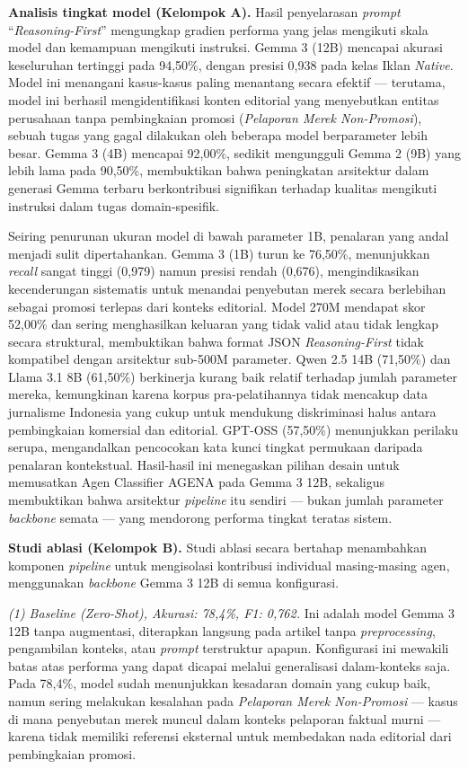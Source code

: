 \documentclass{ieeeaccess}
\begin{document}
\textbf{Analisis tingkat model (Kelompok A).} Hasil penyelarasan \textit{prompt} ``\textit{Reasoning-First}'' mengungkap gradien performa yang jelas mengikuti skala model dan kemampuan mengikuti instruksi. Gemma 3 (12B) mencapai akurasi keseluruhan tertinggi pada 94,50\%, dengan presisi 0,938 pada kelas Iklan \textit{Native}. Model ini menangani kasus-kasus paling menantang secara efektif --- terutama, model ini berhasil mengidentifikasi konten editorial yang menyebutkan entitas perusahaan tanpa pembingkaian promosi (\textit{Pelaporan Merek Non-Promosi}), sebuah tugas yang gagal dilakukan oleh beberapa model berparameter lebih besar. Gemma 3 (4B) mencapai 92,00\%, sedikit mengungguli Gemma 2 (9B) yang lebih lama pada 90,50\%, membuktikan bahwa peningkatan arsitektur dalam generasi Gemma terbaru berkontribusi signifikan terhadap kualitas mengikuti instruksi dalam tugas domain-spesifik.

Seiring penurunan ukuran model di bawah parameter 1B, penalaran yang andal menjadi sulit dipertahankan. Gemma 3 (1B) turun ke 76,50\%, menunjukkan \textit{recall} sangat tinggi (0,979) namun presisi rendah (0,676), mengindikasikan kecenderungan sistematis untuk menandai penyebutan merek secara berlebihan sebagai promosi terlepas dari konteks editorial. Model 270M mendapat skor 52,00\% dan sering menghasilkan keluaran yang tidak valid atau tidak lengkap secara struktural, membuktikan bahwa format JSON \textit{Reasoning-First} tidak kompatibel dengan arsitektur sub-500M parameter. Qwen 2.5 14B (71,50\%) dan Llama 3.1 8B (61,50\%) berkinerja kurang baik relatif terhadap jumlah parameter mereka, kemungkinan karena korpus pra-pelatihannya tidak mencakup data jurnalisme Indonesia yang cukup untuk mendukung diskriminasi halus antara pembingkaian komersial dan editorial. GPT-OSS (57,50\%) menunjukkan perilaku serupa, mengandalkan pencocokan kata kunci tingkat permukaan daripada penalaran kontekstual. Hasil-hasil ini menegaskan pilihan desain untuk memusatkan Agen Classifier AGENA pada Gemma 3 12B, sekaligus membuktikan bahwa arsitektur \textit{pipeline} itu sendiri --- bukan jumlah parameter \textit{backbone} semata --- yang mendorong performa tingkat teratas sistem.

\textbf{Studi ablasi (Kelompok B).} Studi ablasi secara bertahap menambahkan komponen \textit{pipeline} untuk mengisolasi kontribusi individual masing-masing agen, menggunakan \textit{backbone} Gemma 3 12B di semua konfigurasi.

\textit{(1) Baseline (Zero-Shot), Akurasi: 78,4\%, F1: 0,762.} Ini adalah model Gemma 3 12B tanpa augmentasi, diterapkan langsung pada artikel tanpa \textit{preprocessing}, pengambilan konteks, atau \textit{prompt} terstruktur apapun. Konfigurasi ini mewakili batas atas performa yang dapat dicapai melalui generalisasi dalam-konteks saja. Pada 78,4\%, model sudah menunjukkan kesadaran domain yang cukup baik, namun sering melakukan kesalahan pada \textit{Pelaporan Merek Non-Promosi} --- kasus di mana penyebutan merek muncul dalam konteks pelaporan faktual murni --- karena tidak memiliki referensi eksternal untuk membedakan nada editorial dari pembingkaian promosi.
\end{document}
